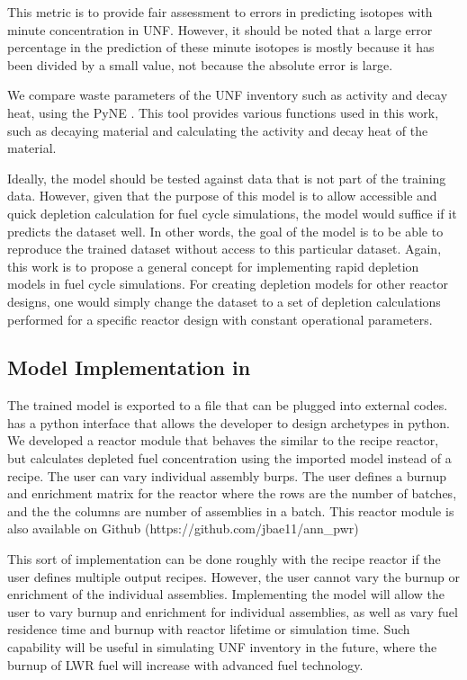 This metric is to provide fair assessment to errors
in predicting isotopes with minute concentration in \gls{UNF}.
However, it should be noted that a large error percentage in the
prediction of these minute isotopes is mostly because it has been
divided by a small value, not because the absolute error is large.

We compare waste parameters of the \gls{UNF} inventory
such as activity and decay heat, using the
\gls{PyNE} \cite{scopatz_pyne:_2012}. This tool provides
various functions used
in this work, such as decaying material and calculating
the activity and decay heat of the material.

Ideally, the model should be tested against data
that is not part of the training data. However, given
that the purpose of this model is to allow accessible and
quick depletion calculation for
fuel cycle simulations, the model would suffice if
it predicts the dataset well. In other words, the
goal of the model is to be able to reproduce the
trained dataset without access to this particular dataset.
Again, this work
is to propose a general concept for implementing
rapid depletion models in fuel cycle simulations.
For creating depletion models for other reactor designs,
one would simply change the dataset to a set of depletion
calculations performed for a specific reactor design with
constant operational parameters.


\subsection{Model Implementation in \Cyclus}

The trained model is exported to a file
that can be plugged into external codes. \Cyclus
has a python interface that allows the developer
to design archetypes in python. We developed a reactor
module that behaves the similar to the recipe reactor,
but calculates depleted fuel concentration using the
imported model instead of a recipe. The user can vary
individual assembly burps. The user defines a burnup
and enrichment
matrix for the reactor where the rows are the number
of batches, and the the columns are number of
assemblies in a batch. This reactor module is also
available on Github 
(https://github.com/jbae11/ann\_pwr)

This sort of implementation can be done roughly with
the recipe reactor if the user defines multiple
output recipes. However, the user cannot vary the
burnup or enrichment of the individual assemblies.
Implementing the model will allow the user to vary
burnup and enrichment for individual assemblies, as well
as vary fuel residence time and burnup with reactor
lifetime or simulation time. Such capability will be
useful in simulating \gls{UNF} inventory in the future,
where the burnup of \gls{LWR} fuel will increase
with advanced fuel technology.
